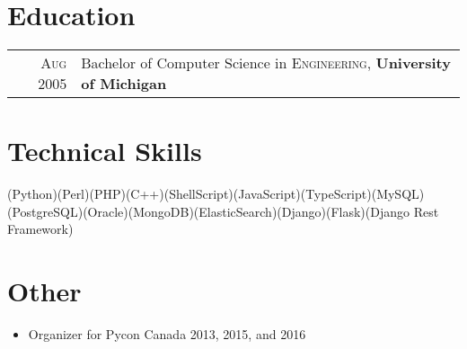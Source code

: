 \documentclass[a4paper,10pt]{article}
\begin{document}
    
        \section{Education}
        \begin{tabular}{rl}
        \textsc{Aug} 2005 & Bachelor of Computer Science in \textsc{Engineering}, \textbf{University of Michigan}\\
        \end{tabular}
    

    
        \section{Technical Skills}
        \tagbox(Python)\tagbox(Perl)\tagbox(PHP)\tagbox(C++)\tagbox(ShellScript)\tagbox(JavaScript)\tagbox(TypeScript)\tagbox(MySQL)\tagbox(PostgreSQL)\tagbox(Oracle)\tagbox(MongoDB)\tagbox(ElasticSearch)\tagbox(Django)\tagbox(Flask)\tagbox(Django Rest Framework)

    
    \section {Other}
    \begin{itemize}
        \item Organizer for Pycon Canada 2013, 2015, and 2016
    \end{itemize}
    
\end{document}
